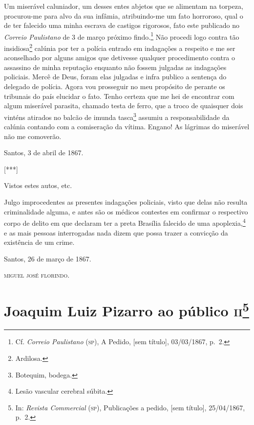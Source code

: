Um miserável caluniador, um desses entes abjetos que se alimentam na
torpeza, procurou-me para alvo da sua infâmia, atribuindo-me um fato
horroroso, qual o de ter falecido uma minha escrava de castigos
rigorosos, fato este publicado no \emph{Correio Paulistano} de 3 de
março próximo findo.\footnote{ Cf. \emph{Correio Paulistano} (\textsc{sp}), A
  Pedido, {[}sem título{]}, 03/03/1867, p.~2.} Não procedi logo contra
tão insidiosa\textsuperscript{⁠}\footnote{ Ardilosa.} calúnia por ter
a polícia entrado em indagações a respeito e me ser aconselhado por
alguns amigos que detivesse qualquer procedimento contra o assassino de
minha reputação enquanto não fossem julgadas as indagações policiais.
Mercê de Deus, foram elas julgadas e infra publico a sentença do
delegado de polícia. Agora vou prosseguir no meu propósito de perante os
tribunais do país elucidar o fato. Tenho certeza que me hei de encontrar
com algum miserável parasita, chamado testa de ferro, que a troco de
quaisquer dois vinténs atirados no balcão de imunda
tasca\textsuperscript{⁠}\footnote{ Botequim, bodega.} assumiu a
responsabilidade da calúnia contando com a comiseração da vítima.
Engano! As lágrimas do miserável não me comoverão.
\begin{flushright}
Santos, 3 de abril de 1867.
\end{flushright}
{[}***{]}

Vistos estes autos, etc.

Julgo improcedentes as presentes indagações policiais, visto que delas
não resulta criminalidade alguma, e antes são os médicos contestes em
confirmar o respectivo corpo de delito em que declaram ter a preta
Brasília falecido de uma apoplexia,\footnote{ Lesão vascular cerebral
  súbita.} e as mais pessoas interrogadas nada dizem que possa trazer a
convicção da existência de um crime.
\begin{flushright}
Santos, 26 de março de 1867.

\textsc{miguel josé florindo}.
\end{flushright}
\chapter{Joaquim Luiz Pizarro ao público \textsc{ii}\footnote{In: \emph{Revista Commercial} (\textsc{sp}), Publicações a pedido, {[}sem título{]}, 25/04/1867, p.~2.}}

